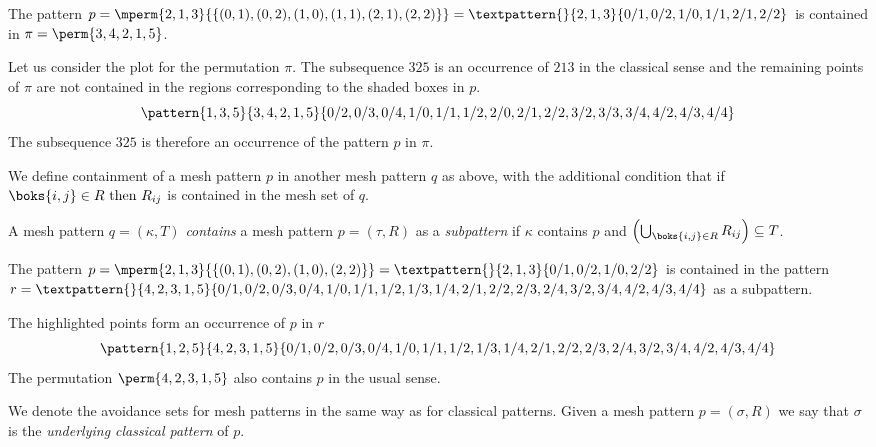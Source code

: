 \begin{example}
    The pattern \(p=\mperm{2,1,3}{\{(0,1),(0,2),(1,0),(1,1),(2,1),(2,2)\}}=
    \textpattern{}{ 2, 1, 3 }{ 0/1, 0/2, 1/0, 1/1, 2/1, 2/2 }\) is contained in
    \(\pi = \perm{3,4,2,1,5}\).
\end{example}

Let us consider the plot for the permutation \(\pi\). The subsequence \(325\) is
an occurrence of \(213\) in the classical sense and the remaining points of \(\pi\)
are not contained in the regions corresponding to the shaded boxes in \(p\).
\begin{equation*}
    \pattern{1,3,5}{3,4,2,1,5}{0/2,0/3,0/4,
                               1/0,1/1,1/2,
                               2/0,2/1,2/2,
                               3/2,3/3,3/4,
                               4/2,4/3,4/4}
\end{equation*}
The subsequence \(325\) is therefore an occurrence of the pattern \(p\) in \(\pi\).

We define containment of a mesh pattern \(p\) in another mesh pattern \(q\) as above,
with the additional condition that if \(\boks{i,j}\in R\text{ then } R_{ij}\) is
contained in the mesh set of \(q\).

\begin{definition}
A mesh pattern \(q=(\kappa,T)\) \emph{contains} a mesh pattern \(p=(\tau,R)\) as a \emph{subpattern}
if \(\kappa\) contains \(p\) and \(\left(\bigcup_{\boks{i,j}\in R} R_{ij}\right)\subseteq T\).
\end{definition}

\begin{example}
    The pattern \(p=\mperm{2,1,3}{\{(0,1),(0,2),(1,0),(2,2)\}}=
    \textpattern{}{ 2, 1, 3 }{ 0/1, 0/2, 1/0, 2/2 }\) is contained in the pattern
    \(r = \textpattern{}{4,2,3,1,5}{0/1,0/2,0/3,0/4,
                               1/0,1/1,1/2,1/3,1/4,
                               2/1,2/2,2/3,2/4,
                               3/2,3/4,
                               4/2,4/3,4/4} \) as a subpattern.
\end{example}

The highlighted points form an occurrence of \(p\) in \(r\)
\begin{equation*}
    \pattern{1,2,5}{4,2,3,1,5}{0/1,0/2,0/3,0/4,
                               1/0,1/1,1/2,1/3,1/4,
                               2/1,2/2,2/3,2/4,
                               3/2,3/4,
                               4/2,4/3,4/4}
\end{equation*}
The permutation \(\perm{4,2,3,1,5}\) also contains \(p\) in the usual sense.

We denote the avoidance sets for mesh patterns in the same way as for
classical patterns. Given a mesh pattern \(p=(\sigma,R)\) we say that \(\sigma\) is the \emph{underlying
classical pattern} of \(p\).
